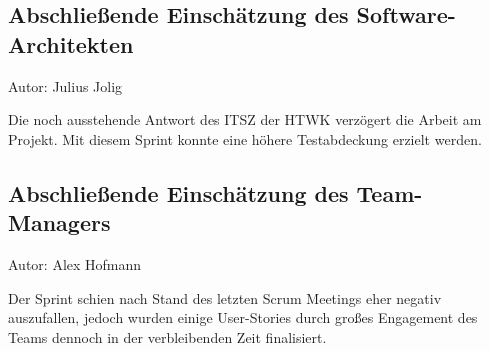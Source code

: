 \subsection{Abschließende Einschätzung des Software-Architekten}
{\small Autor: Julius Jolig}

Die noch ausstehende Antwort des ITSZ der HTWK verzögert die Arbeit am Projekt. Mit diesem Sprint konnte eine höhere Testabdeckung erzielt werden. 

\subsection{Abschließende Einschätzung des Team-Managers}
{\small Autor: Alex Hofmann}

Der Sprint schien nach Stand des letzten Scrum Meetings eher negativ auszufallen, jedoch wurden einige User-Stories durch großes Engagement des Teams dennoch in der verbleibenden Zeit finalisiert.


